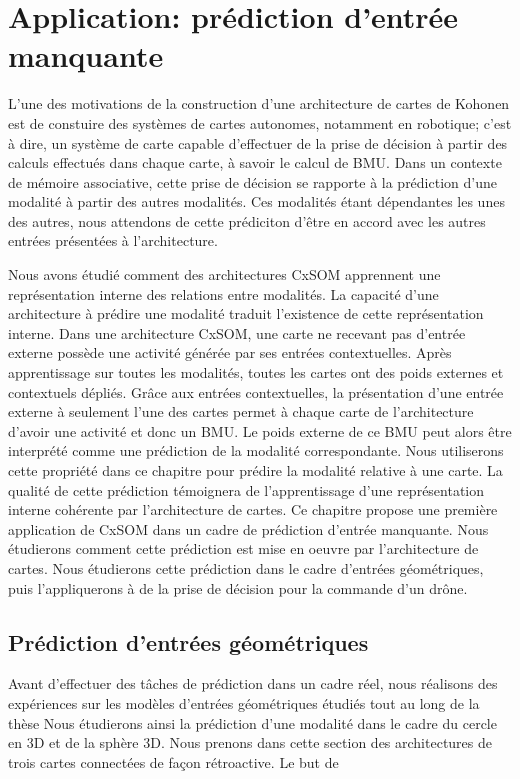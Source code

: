 \chapter{Application: prédiction d'entrée manquante}
\graphicspath{{08-Application/}}
\minitoc


L'une des motivations de la construction d'une architecture de cartes de Kohonen est de constuire des systèmes de cartes autonomes, notamment en robotique; c'est à dire, un système de carte capable d'effectuer de la prise de décision à partir des calculs effectués dans chaque carte, à savoir le calcul de BMU.
Dans un contexte de mémoire associative, cette prise de décision se rapporte à la prédiction d'une modalité à partir des autres modalités. Ces modalités étant dépendantes les unes des autres, nous attendons de cette prédiciton d'être en accord avec les autres entrées présentées à l'architecture.

Nous avons étudié comment des architectures CxSOM apprennent une représentation interne des relations entre modalités.
La capacité d'une architecture à prédire une modalité traduit l'existence de cette représentation interne.
Dans une architecture CxSOM, une carte ne recevant pas d'entrée externe possède une activité générée par ses entrées contextuelles.
Après apprentissage sur toutes les modalités, toutes les cartes ont des poids externes et contextuels dépliés.
Grâce aux entrées contextuelles, la présentation d'une entrée externe à seulement l'une des cartes permet à chaque carte de l'architecture d'avoir une activité et donc un BMU. Le poids externe de ce BMU peut alors être interprété comme une prédiction de la modalité correspondante.
Nous utiliserons cette propriété dans ce chapitre pour prédire la modalité relative à une carte. La qualité de cette prédiction témoignera de l'apprentissage d'une représentation interne cohérente par l'architecture de cartes. 
Ce chapitre propose une première application de CxSOM dans un cadre de prédiction d'entrée manquante. Nous étudierons comment cette prédiction est mise en oeuvre par l'architecture de cartes. Nous étudierons cette prédiction dans le cadre d'entrées géométriques, puis l'appliquerons à de la prise de décision pour la commande d'un drône.

\section{Prédiction d'entrées géométriques}

Avant d'effectuer des tâches de prédiction dans un cadre réel, nous réalisons des expériences sur les modèles d'entrées géométriques étudiés tout au long de la thèse
Nous étudierons ainsi la prédiction d'une modalité dans le cadre du cercle en 3D et de la sphère 3D. 
Nous prenons dans cette section des architectures de trois cartes connectées de façon rétroactive. 
Le but de 

